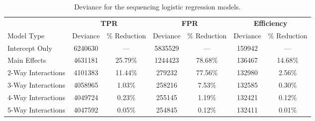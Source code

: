 \documentclass[12pt]{article}
\begin{document}
\begin{table}[ht]
\centering
\begin{tabular}{l|cc|cc|cc}
  \hline
	& \multicolumn{2}{c|}{\textbf{TPR}} & \multicolumn{2}{c|}{\textbf{FPR}} & \multicolumn{2}{c}{\textbf{Efficiency}}\\
	Model Type & Deviance & \% Reduction & Deviance & \% Reduction & Deviance & \% Reduction\\
  \hline
	Intercept Only & 6240630 & --- & 5835529 & --- & 159942 & ---\\
	Main Effects  & 4631181 & 25.79\% & 1244423 & 78.68\% & 136467 & 14.68\%\\
	2-Way Interactions  & 4101383 & 11.44\% & 279232 & 77.56\% & 132980 & 2.56\%\\
	3-Way Interactions  & 4058965 & 1.03\% & 258216 & 7.53\% & 132585 & 0.30\%\\
	4-Way Interactions  & 4049724 & 0.23\% & 255145 & 1.19\% & 132421 & 0.12\%\\
	5-Way Interactions  & 4047592 & 0.05\% & 254845 & 0.12\% & 132411 & 0.01\%\\
   \hline
\end{tabular}
\caption{Deviance for the sequencing logistic regression models.}
\label{tab:devSeq}
\end{table}
\end{document}
